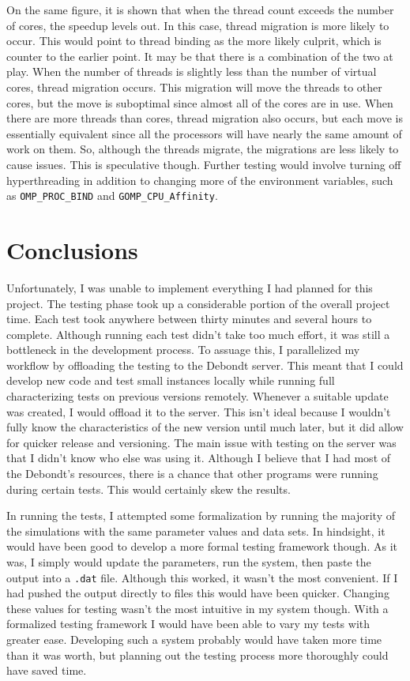\documentclass[10pt,letterpaper]{article}
\begin{document}
On the same figure, it is shown that when the thread count exceeds the number of cores, the speedup levels out. In this case, thread migration is more likely to occur. This would point to thread binding as the more likely culprit, which is counter to the earlier point. It may be that there is a combination of the two at play. When the number of threads is slightly less than the number of virtual cores, thread migration occurs. This migration will move the threads to other cores, but the move is suboptimal since almost all of the cores are in use. When there are more threads than cores, thread migration also occurs, but each move is essentially equivalent since all the processors will have nearly the same amount of work on them. So, although the threads migrate, the migrations are less likely to cause issues. This is speculative though. Further testing would involve turning off hyperthreading in addition to changing more of the environment variables, such as \texttt{OMP\_PROC\_BIND} and \texttt{GOMP\_CPU\_Affinity}. 


\newpage
\section{Conclusions}
Unfortunately, I was unable to implement everything I had planned for this project. The testing phase took up a considerable portion of the overall project time. Each test took anywhere between thirty minutes and several hours to complete. Although running each test didn't take too much effort, it was still a bottleneck in the development process. To assuage this, I parallelized my workflow by offloading the testing to the Debondt server. This meant that I could develop new code and test small instances locally while running full characterizing tests on previous versions remotely. Whenever a suitable update was created, I would offload it to the server. This isn't ideal because I wouldn't fully know the characteristics of the new version until much later, but it did allow for quicker release and versioning. The main issue with testing on the server was that I didn't know who else was using it. Although I believe that I had most of the Debondt's resources, there is a chance that other programs were running during certain tests. This would certainly skew the results.

In running the tests, I attempted some formalization by running the majority of the simulations with the same parameter values and data sets. In hindsight, it would have been good to develop a more formal testing framework though. As it was, I simply would update the parameters, run the system, then paste the output into a \texttt{.dat} file. Although this worked, it wasn't the most convenient. If I had pushed the output directly to files this would have been quicker. Changing these values for testing wasn't the most intuitive in my system though. With a formalized testing framework I would have been able to vary my tests with greater ease. Developing such a system probably would have taken more time than it was worth, but planning out the testing process more thoroughly could have saved time. 
\end{document}
